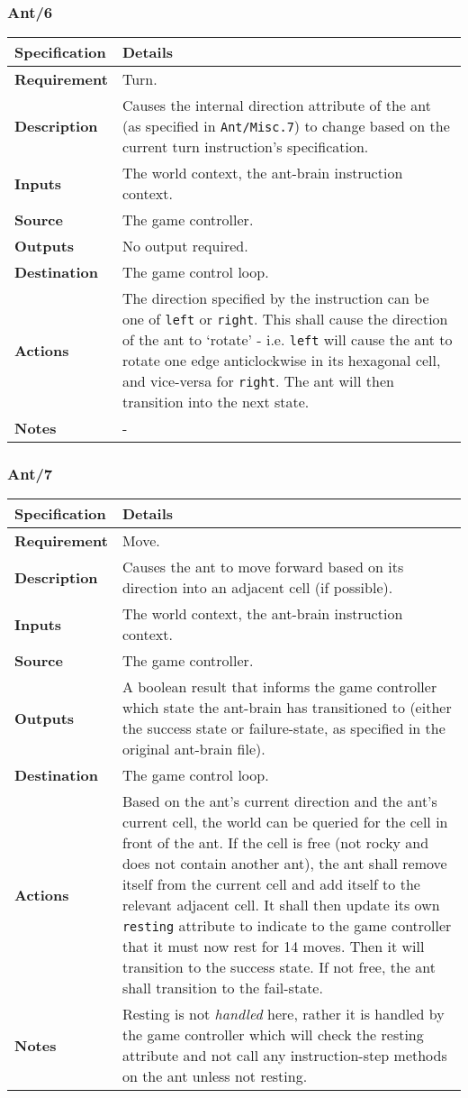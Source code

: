 \documentclass[11pt]{article}
\begin{document}
\subsubsection*{Ant/6}\label{ant6}

\begin{longtable}[c]{@{\extracolsep{\fill}}|p{}|p{}|@{}}
\hline
Specification & Details\tabularnewline
\hline

\textbf{Requirement} & Turn.\tabularnewline
\textbf{Description} & Causes the internal direction attribute of the
ant (as specified in \texttt{Ant/Misc.7}) to change based on the current
turn instruction's specification.\tabularnewline
\textbf{Inputs} & The world context, the ant-brain instruction
context.\tabularnewline
\textbf{Source} & The game controller.\tabularnewline
\textbf{Outputs} & No output required.\tabularnewline
\textbf{Destination} & The game control loop.\tabularnewline
\textbf{Actions} & The direction specified by the instruction can be one
of \texttt{left} or \texttt{right}. This shall cause the direction of
the ant to `rotate' - i.e. \texttt{left} will cause the ant to rotate
one edge anticlockwise in its hexagonal cell, and vice-versa for
\texttt{right}. The ant will then transition into the next
state.\tabularnewline
\textbf{Notes} & -\tabularnewline
\hline
\end{longtable}

\subsubsection*{Ant/7}\label{ant7}

\begin{longtable}[c]{@{\extracolsep{\fill}}|p{}|p{}|@{}}
\hline
Specification & Details\tabularnewline
\hline

\textbf{Requirement} & Move.\tabularnewline
\textbf{Description} & Causes the ant to move forward based on its
direction into an adjacent cell (if possible).\tabularnewline
\textbf{Inputs} & The world context, the ant-brain instruction
context.\tabularnewline
\textbf{Source} & The game controller.\tabularnewline
\textbf{Outputs} & A boolean result that informs the game controller
which state the ant-brain has transitioned to (either the success state
or failure-state, as specified in the original ant-brain
file).\tabularnewline
\textbf{Destination} & The game control loop.\tabularnewline
\textbf{Actions} & Based on the ant's current direction and the ant's
current cell, the world can be queried for the cell in front of the ant.
If the cell is free (not rocky and does not contain another ant), the
ant shall remove itself from the current cell and add itself to the
relevant adjacent cell. It shall then update its own \texttt{resting}
attribute to indicate to the game controller that it must now rest for
14 moves. Then it will transition to the success state. If not free, the
ant shall transition to the fail-state.\tabularnewline
\textbf{Notes} & Resting is not \emph{handled} here, rather it is
handled by the game controller which will check the resting attribute
and not call any instruction-step methods on the ant unless not
resting.\tabularnewline
\hline
\end{longtable}
\end{document}
